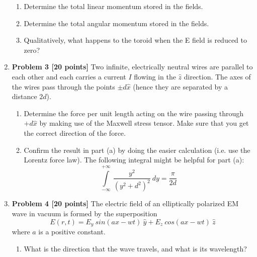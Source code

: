\documentclass[fleqn]{article}
\begin{document}
\begin{enumerate}
\begin{enumerate}

        \item Determine the total linear momentum stored in the fields.


        \item Determine the total angular momentum stored in the fields.


        \item Qualitatively, what happens to the toroid when the E field is reduced to zero?


      \end{enumerate}

    \item \textbf{Problem 3 [20 points]} 
    Two infinite, electrically neutral wires are parallel to each other and each carries a current $I$ flowing
    in the $\hat{z}$ direction. The axes of the wires pass through the points $\pm d\hat{x}$ (hence they are separated by
    a distance $2d$).
    \begin{enumerate}
      \item Determine the force per unit length acting on the wire passing through $+d\hat{x}$ by making use of
      the Maxwell stress tensor. Make sure that you get the correct direction of the force.



      \item Confirm the result in part (a) by doing the easier calculation (i.e. use the Lorentz force law).
      The following integral might be helpful for part (a):
      $$
        \int\limits_{-\infty}^{+\infty} ~ \dfrac{y^2}{\left(y^2+d^2\right)^2} ~ dy=\dfrac{\pi}{2d} 
      $$


    \end{enumerate}

    \item \textbf{Problem 4 [20 points]} The electric field of an elliptically polarized EM wave in vacuum is formed by the superposition
      $$
        E(r,t)=E_y ~ sin(ax-wt) ~ \hat{y}+E_z ~ cos(ax-wt) ~ \hat{z}
      $$
      where $a$ is a positive constant.
      \begin{enumerate}
        \item What is the direction that the wave travels, and what is its wavelength?


\end{enumerate}
\end{enumerate}
\end{document}
